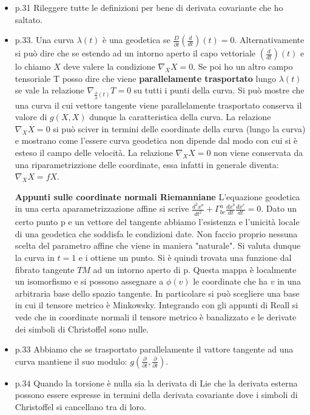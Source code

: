 \documentclass[10pt,a4paper]{article}
\begin{document}
\begin{itemize}
\item p.31 Rileggere tutte le definizioni per bene di derivata covariante che ho saltato.

\item p.33. Una curva $\lambda(t)$ è una geodetica se $\frac{D}{\partial t} (\frac{d}{dt})(t) = 0$. Alternativamente si può dire che se estendo ad un intorno aperto il capo vettoriale $(\frac{d}{dt})(t)$ e lo chiamo $X$ deve valere la condizione $\nabla_{X} X = 0$. Se poi ho un altro campo tensoriale T posso dire che viene \textbf{parallelamente trasportato} lungo $\lambda (t)$ se vale la relazione $\nabla_{\frac{\partial}{\partial} (t)} T = 0$ su tutti i punti della curva. Si può mostre che una curva il cui vettore tangente viene parallelamente trasportato conserva il valore di $g(X, X)$ dunque la caratteristica della curva. La relazione $\nabla_{X} X = 0$ si può sciver in termini delle coordinate della curva (lungo la curva) e mostrano come l'essere curva geodetica non dipende dal modo con cui si è esteso il campo delle velocità.
La relazione $\nabla_{X} X = 0$ non viene conservata da una riparametrizzione delle coordinate, essa infatti in generale diventa: $\nabla_{X} X = fX$.

\textbf{Appunti sulle coordinate normali Riemanniane}
L'equazione geodetica in una certa aparametrizzazione affine si scrive $\frac{d^{2}x^{a}}{dt^{2}}+\Gamma^{a}_{bc} \frac{dx^{b}}{dt} \frac{dx^{c}}{dt} = 0$. Dato un certo punto p e un vettore del tangente abbiamo l'esistenza e l'unicità locale di una geodetica che soddisfa le condizioni date. Non faccio proprio nessuna scelta del parametro affine che viene in maniera "naturale". Si valuta dunque la curva in $t = 1$ e i ottiene un punto. Si è quindi trovata una funzione dal fibrato tangente $TM$ ad un intorno aperto di p. Questa mappa è localmente un isomorfismo e si possono assegnare a $\phi(v)$ le coordinate che ha $v$ in una arbitraria base dello spazio tangente. In particolare si può scegliere una base in cui il tensore metrico è Minkowsky. Integrando con gli appunti di Reall si vede che in coordinate normali il tensore metrico è banalizzato e le derivate dei simboli di Christoffel sono nulle.

\item p.33 Abbiamo che se trasportato parallelamente il vattore tangente ad una curva mantiene il suo modulo: $g(\frac{\partial}{\partial t}, \frac{\partial}{\partial t})$.

\item p.34 Quando la torsione è nulla sia la derivata di Lie che la derivata esterna possono essere espresse in termini della derivata covariante dove i simboli di Christoffel si cancellano tra di loro.


\end{itemize}
\end{document}
